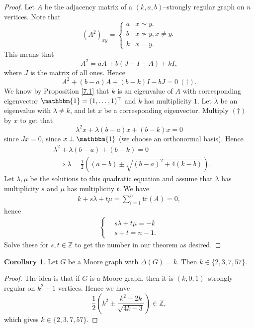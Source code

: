 \documentclass{article}
\theoremstyle{definition}
\newtheorem{cor}[theorem]{Corollary}
\begin{document}
\begin{proof}
    Let $A$ be the adjacency matrix of a $(k,a,b)$--strongly regular graph on $n$ vertices. Note that 
    \[
    (A^2)_{xy} = \begin{cases}
        a &x \sim y.\\
        b &x \not\sim y, x \neq y.\\
        k &x=y.
    \end{cases}
    \]
    This means that \[
    A^2 = a A + b(J-I-A) + kI,
    \]
    where $J$ is the matrix of all ones. Hence \[
    A^2+(b-a)A+(b-k)I-bJ=0 ~(\dagger).
    \]
    We know by Proposition \ref{7.1} that $k$ is an eigenvalue of $A$ with corresponding eigenvector $\mathbbm{1}=(1,\ldots,1)^\top$ and $k$ has multiplicity $1$. Let $\lambda$ be an eigenvalue with $\lambda \neq k$, and let $x$ be a corresponding eigenvector. Multiply $(\dagger)$ by $x$ to get that \[
    \lambda^2 x + \lambda(b-a)x + (b-k)x = 0
    \]
    since $Jx = 0$, since $x \perp \mathbbm{1}$ (we choose an orthonormal basis). Hence
    \begin{align*}
        &\lambda^2+\lambda(b-a)+(b-k)=0 \\
        &\implies \lambda = \frac{1}{2} \left((a-b) \pm \sqrt{(b-a)^2 + 4(k-b)}\right).
    \end{align*}
    Let $\lambda,\mu$ be the solutions to this quadratic equation and assume that $\lambda$ has multiplicity $s$ and $\mu$ has multiplicity $t$. %
    We have 
    \begin{align*}
        k + s \lambda + t \mu = \sum_{i=1}^{n} \text{tr}(A) = 0,
    \end{align*}
    hence
    \begin{align*}
        \begin{cases}
            &s \lambda + t \mu = -k\\
            &s + t = n-1.
        \end{cases} 
    \end{align*}
    Solve these for $s,t \in \mathbb{Z}$ to get the number in our theorem as desired.
\end{proof}
\begin{cor}
    Let $G$ be a Moore graph with $\Delta(G)=k$. Then $k \in \{2,3,7,57\}$.
\end{cor}
\begin{proof}
    The idea is that if $G$ is a Moore graph, then it is $(k,0,1)$--strongly regular on $k^2+1$ vertices. Hence we have \[
    \frac{1}{2}\left(k^2 \pm  \frac{k^2-2k}{\sqrt{4k-3}}\right) \in \mathbb{Z},
    \]
    which gives $k \in \{2,3,7,57\}$.
\end{proof}
\end{document}

